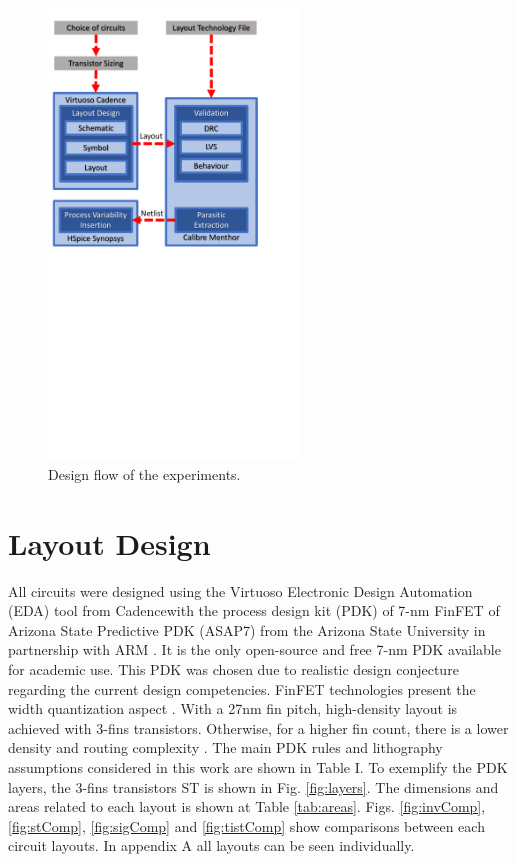 \documentclass[pgmicro,mestrado,english]{iiufrgs}
\begin{document}
\begin{figure}[]
\centering
\includegraphics[width=0.6\textwidth, trim={0.25cm 16cm 3cm 0.5cm},clip]{designFlow.pdf}
\caption{Design flow of the experiments.}
\label{DesignFlow}
\end{figure}

\section{Layout Design}

All circuits were designed using the Virtuoso Electronic Design Automation (EDA) tool from Cadence\textregistered with the process design kit (PDK) of 7-nm FinFET of Arizona State Predictive PDK (ASAP7) from the Arizona State University in partnership with ARM \cite{clark2016asap7}. It is the only open-source and free 7-nm PDK available for academic use. This PDK was chosen due to realistic design conjecture regarding the current design competencies. FinFET technologies present the width quantization aspect \cite{2000Simulations}. With a 27nm fin pitch, high-density layout is achieved with 3-fins transistors. Otherwise, for a higher fin count, there is a lower density and routing complexity \cite{chava2015standard}. The main PDK rules and lithography assumptions considered in this work are shown in Table I. To exemplify the PDK layers, the 3-fins transistors ST is shown in Fig. \ref{fig:layers}. The dimensions and areas related to each layout is shown at Table \ref{tab:areas}. Figs. \ref{fig:invComp}, \ref{fig:stComp}, \ref{fig:sigComp} and \ref{fig:tistComp} show comparisons between each circuit layouts. In appendix A all layouts can be seen individually. %
\end{document}
